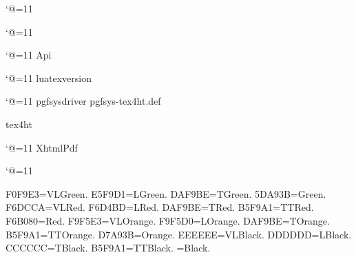 \relax








\catcode`@=11\relax


\catcode`@=11\relax

\catcode`@=11\relax
%
\newif\ifHtml\Htmlfalse
\ifcsname Api\endcsname
	 \Api
\fi


\catcode`@=11\relax
\ifcsname luatexversion\endcsname
	\def\LD@Engine{luatex}%
\else
	\def\LD@Engine{xetex}%
\fi

\catcode`@=11\relax
\ifcsname pgfsysdriver\endcsname
	\def\LD@Html@Test{pgfsys-tex4ht.def}%
		\def\LD@Output{Xhtml}%
	\ifx\LD@Html@Test\pgfsysdriver
		\Htmltrue
	\fi
\else
	\def\pgfsysdriver{pgfsys-xetex.def}%
	\def\LD@Output{Pdf}%
\fi










\csname tex4ht\endcsname


\catcode`@=11\relax
\def\LD@Output@Test{Xhtml}%
\ifx\LD@Output@Test\LD@Output
	
	
\else
	
\fi

\ifHtml
\else \let\ancientjobname\jobname
\edef\jobname{\ancientjobname-print}
\definecontentsfile{toc}
\edef\indexfilebasename{\ancientjobname-print}
\fi
\def\Tilde{\char`\~}


\let\Q=\left
\let\W=\right
\let\F=\over
\let\b=\big
\let\B=\Big
\def\d{\,\mbox{\rm d}}                                              %


\SecLabelEqtrue             %
\NumReftrue                    %

\catcode `@=11\relax




\DefineRGBcolor F0F9E3=VLGreen.
\DefineRGBcolor E5F9D1=LGreen.
\DefineRGBcolor DAF9BE=TGreen.
\DefineRGBcolor 5DA93B=Green.
\DefineRGBcolor F6DCCA=VLRed.
\DefineRGBcolor F6D4BD=LRed.
\DefineRGBcolor DAF9BE=TRed.
\DefineRGBcolor B5F9A1=TTRed.
\DefineRGBcolor F6B080=Red.
\DefineRGBcolor F9F5E3=VLOrange.
\DefineRGBcolor F9F5D0=LOrange.
\DefineRGBcolor DAF9BE=TOrange.
\DefineRGBcolor B5F9A1=TTOrange.
\DefineRGBcolor D7A93B=Orange.
\DefineRGBcolor EEEEEE=VLBlack.
\DefineRGBcolor DDDDDD=LBlack.
\DefineRGBcolor CCCCCC=TBlack.
\DefineRGBcolor B5F9A1=TTBlack.
=Black.

